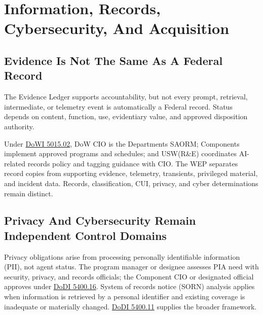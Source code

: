 \documentclass[11pt]{article}
\begin{document}
\hypertarget{8-information-records-cybersecurity-and-acquisition}{%
\section{Information, Records, Cybersecurity, And
Acquisition}\label{8-information-records-cybersecurity-and-acquisition}}

\hypertarget{81-evidence-is-not-the-same-as-a-federal-record}{%
\subsection{Evidence Is Not The Same As A Federal
Record}\label{81-evidence-is-not-the-same-as-a-federal-record}}

The Evidence Ledger supports accountability, but not every prompt,
retrieval, intermediate, or telemetry event is automatically a Federal
record. Status depends on content, function, use, evidentiary value, and
approved disposition authority.

Under
\href{https://www.esd.whs.mil/Portals/54/Documents/DD/issuances/dodi/501502p.pdf}{DoWI
5015.02}, DoW CIO is the Department\textquotesingle s SAORM; Components
implement approved programs and schedules; and USW(R\&E) coordinates
AI-related records policy and tagging guidance with CIO. The WEP
separates record copies from supporting evidence, telemetry, transients,
privileged material, and incident data. Records, classification, CUI,
privacy, and cyber determinations remain distinct.

\hypertarget{82-privacy-and-cybersecurity-remain-independent-control-domains}{%
\subsection{Privacy And Cybersecurity Remain Independent Control
Domains}\label{82-privacy-and-cybersecurity-remain-independent-control-domains}}

Privacy obligations arise from processing personally identifiable
information (PII), not agent status. The program manager or designee
assesses PIA need with security, privacy, and records officials; the
Component CIO or designated official approves under
\href{https://www.esd.whs.mil/Portals/54/Documents/DD/issuances/dodi/540016p.pdf}{DoDI
5400.16}. System of records notice (SORN) analysis applies when
information is retrieved by a personal identifier and existing coverage
is inadequate or materially changed.
\href{https://www.esd.whs.mil/Portals/54/Documents/DD/issuances/dodi/540011p.pdf}{DoDI
5400.11} supplies the broader framework.
\end{document}
